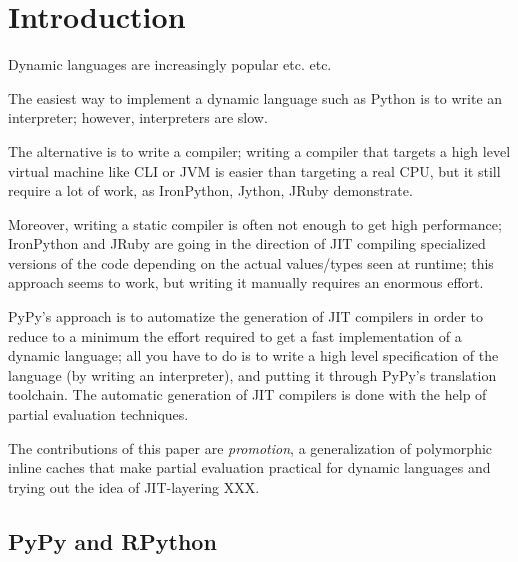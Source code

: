 \section{Introduction}

Dynamic languages are increasingly popular etc. etc.

The easiest way to implement a dynamic language such as Python is to write an
interpreter; however, interpreters are slow.

The alternative is to write a compiler; writing a compiler that targets a high
level virtual machine like CLI or JVM is easier than targeting a real CPU, but
it still require a lot of work, as IronPython, Jython, JRuby demonstrate.

Moreover, writing a static compiler is often not enough to get high
performance; IronPython and JRuby are going in the direction of JIT compiling
specialized versions of the code depending on the actual values/types seen at
runtime; this approach seems to work, but writing it manually requires an
enormous effort.


PyPy's approach is to automatize the generation of JIT compilers in order
to reduce to a minimum the effort required to get a fast implementation of a
dynamic language; all you have to do is to write a high level specification of
the language (by writing an interpreter), and putting it through PyPy's
translation toolchain. The automatic generation of JIT compilers is done with
the help of partial evaluation techniques.

The contributions of this paper are \emph{promotion}, a generalization of
polymorphic inline caches that make partial evaluation practical for dynamic
languages and trying out the idea of JIT-layering XXX.

\subsection{PyPy and RPython}


